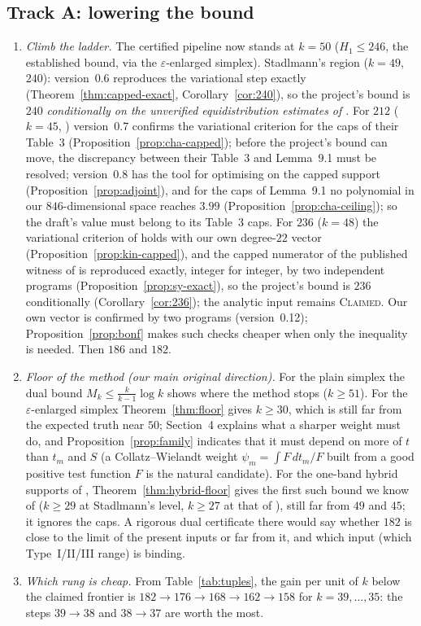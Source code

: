 \documentclass[11pt]{amsart}
\theoremstyle{definition}
\theoremstyle{remark}
\newcommand{\lbl}[1]{\textup{\textsc{#1}}}
\begin{document}
\subsection*{Track A: lowering the bound}
\begin{enumerate}
\item \emph{Climb the ladder.} The certified pipeline now stands at $k=50$
($H_1\le246$, the established bound, via the $\varepsilon$-enlarged simplex).
Stadlmann's region ($k=49$, $240$): version~0.6 reproduces the variational
step exactly (Theorem~\ref{thm:capped-exact}, Corollary~\ref{cor:240}), so the
project's bound is $240$ \emph{conditionally on the unverified
equidistribution estimates of \cite{Sta26}}. For $212$ ($k=45$,
\cite{Cha26}) version~0.7 confirms the variational criterion for the caps of
their Table~3 (Proposition~\ref{prop:cha-capped}); before the project's bound
can move, the discrepancy between their Table~3 and Lemma~9.1 must be
resolved; version~0.8 has the tool for optimising on the capped support
(Proposition~\ref{prop:adjoint}), and for the caps of Lemma~9.1 no polynomial in
our $846$-dimensional space reaches $3.99$ (Proposition~\ref{prop:cha-ceiling});
so the draft's value must belong to its Table~3 caps. For $236$ ($k=48$) the variational criterion of \cite{Kin26} holds with
our own degree-$22$ vector (Proposition~\ref{prop:kin-capped}), and the
capped numerator of the published witness of \cite{SY26} is reproduced
exactly, integer for integer, by two independent programs
(Proposition~\ref{prop:sy-exact}), so the project's bound is $236$
conditionally (Corollary~\ref{cor:236}); the analytic input remains
\lbl{Claimed}. Our own vector is confirmed by
two programs (version~0.12); Proposition~\ref{prop:bonf} makes such checks cheaper
when only the inequality is needed. Then
$186$ and $182$.
\item \emph{Floor of the method (our main original direction).} For the plain
simplex the dual bound $M_k\le\frac{k}{k-1}\log k$ shows where the method
stops ($k\ge51$). For the $\varepsilon$-enlarged simplex
Theorem~\ref{thm:floor} gives $k\ge30$, which is still far from the expected
truth near $50$; Section~4 explains what a sharper weight must do, and
Proposition~\ref{prop:family} indicates that it must depend on more of $t$
than $t_m$ and $S$ (a Collatz--Wielandt weight $\psi_m=\int F\,dt_m/F$ built
from a good positive test function $F$ is the natural candidate). For the
one-band hybrid supports of \cite{Sta26,Cha26},
Theorem~\ref{thm:hybrid-floor} gives the first such bound we know of
($k\ge29$ at Stadlmann's level, $k\ge27$ at that of \cite{Cha26}), still
far from $49$ and $45$; it ignores the caps. A rigorous
dual certificate there would say whether $182$ is close to the limit of the
present inputs or far from it, and which input (which Type~I/II/III range) is
binding.
\item \emph{Which rung is cheap.} From Table~\ref{tab:tuples}, the gain per
unit of $k$ below the claimed frontier is $182\to176\to168\to162\to158$
for $k=39,\dots,35$: the steps $39\to38$ and $38\to37$ are worth the most.
\end{enumerate}
\end{document}
